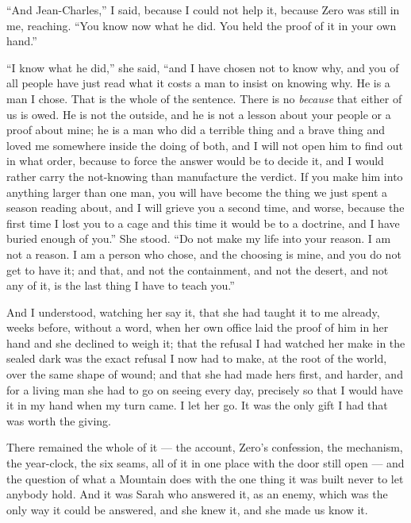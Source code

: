 ``And Jean-Charles,'' I said, because I could not help it, because Zero was still in me, reaching. ``You know now what he did. You held the proof of it in your own hand.''\par

``I know what he did,'' she said, ``and I have chosen not to know why, and you of all people have just read what it costs a man to insist on knowing why. He is a man I chose. That is the whole of the sentence. There is no \emph{because} that either of us is owed. He is not the outside, and he is not a lesson about your people or a proof about mine; he is a man who did a terrible thing and a brave thing and loved me somewhere inside the doing of both, and I will not open him to find out in what order, because to force the answer would be to decide it, and I would rather carry the not-knowing than manufacture the verdict. If you make him into anything larger than one man, you will have become the thing we just spent a season reading about, and I will grieve you a second time, and worse, because the first time I lost you to a cage and this time it would be to a doctrine, and I have buried enough of you.'' She stood. ``Do not make my life into your reason. I am not a reason. I am a person who chose, and the choosing is mine, and you do not get to have it; and that, and not the containment, and not the desert, and not any of it, is the last thing I have to teach you.''\par

And I understood, watching her say it, that she had taught it to me already, weeks before, without a word, when her own office laid the proof of him in her hand and she declined to weigh it; that the refusal I had watched her make in the sealed dark was the exact refusal I now had to make, at the root of the world, over the same shape of wound; and that she had made hers first, and harder, and for a living man she had to go on seeing every day, precisely so that I would have it in my hand when my turn came. I let her go. It was the only gift I had that was worth the giving.\par

\ornament

There remained the whole of it --- the account, Zero's confession, the mechanism, the year-clock, the six seams, all of it in one place with the door still open --- and the question of what a Mountain does with the one thing it was built never to let anybody hold. And it was Sarah who answered it, as an enemy, which was the only way it could be answered, and she knew it, and she made us know it.\par

